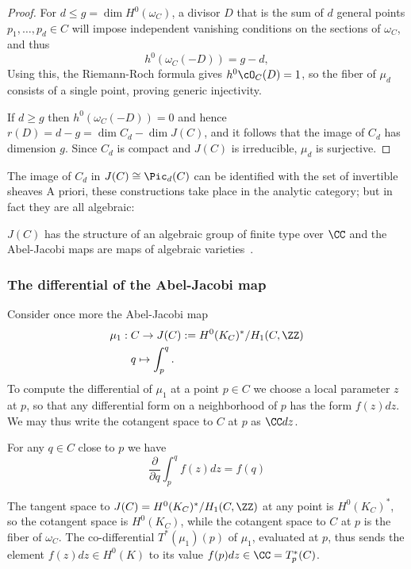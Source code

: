 \begin{proof}
For $d\leq g = \dim H^{0}(\omega_{C})$,  a divisor $D$ that is the sum of $d$ general points $p_{1}, \dots,  p_{d} \in C$ will impose independent vanishing conditions on the sections of $\omega_{C}$, and thus
$$
h^0(\omega_C(-D)) = g-d,
$$
 Using this, the Riemann-Roch formula gives $h^{0}\cO_{C}(D) = 1$, so the fiber of 
$\mu_{d}$ consists of a single point, proving generic injectivity.

If $d \geq g$ then $h^0(\omega_C(-D)) = 0$ and hence $r(D) = d-g= \dim C_{d} - \dim J(C)$, and it follows that the image of $C_d$ has dimension $g$. Since $C_d$ is compact and $J(C)$ is irreducible, $\mu_{d}$ is surjective.
\end{proof}

The image of $C_d$ in $J(C)\cong \Pic_d(C)$ can be identified with the set of invertible sheaves 
A priori, these constructions take place in the analytic category; but in fact they are all algebraic:

\begin{fact}
$J(C)$ has the structure of an algebraic group of finite type over $\CC$ and the Abel-Jacobi maps are
maps of algebraic varieties~\cite[]{Kleiman-PicardScheme}.
\end{fact}

\subsubsection{The differential of the Abel-Jacobi map}\label{Abel-Jacobi differential}

Consider once more the  Abel-Jacobi map
$$
\begin{aligned}
\mu_1 : \; &C \to J(C) := H^0(K_C)^*/H_1(C, \ZZ) \\
&q \mapsto \int_p^q .
\end{aligned}
$$
To compute the differential of $\mu_1$ at a point $p\in C$ we choose a local parameter $z$ at $p$, so that  any differential form on a neighborhood of $p$ has the form $f(z)dz$. We may thus write the cotangent space to $C$ at $p$ as $\CC dz$.

 For any $q\in C$ close to $p$ we have
$$
\frac{\partial}{\partial q} \int_p^q f(z)dz = f(q)
$$

The tangent space to $J(C) =  H^0(K_C)^*/H_1(C, \ZZ)$ at any point is $H^0(K_C)^*$, so the cotangent space is $H^0(K_C)$, while the cotangent space to $C$ at $p$ is the fiber of $\omega_C$.
The co-differential 
$T^*(\mu_1)(p)$ of $\mu_1$, evaluated at $p$, thus sends the element $f(z) dz\in H^0(K)$ to its value
$f(p)dz \in \CC = T^*_p(C)$. 

